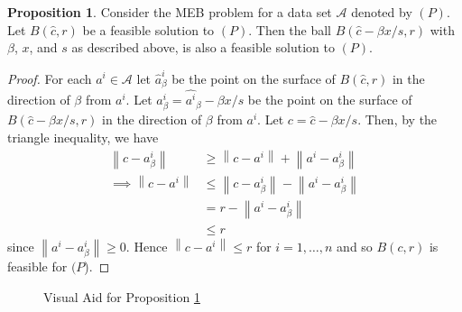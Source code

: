 \documentclass[11pt,twoside]{report}
\newcommand{\A}{\mathcal{A}} %
\newcommand{\norm}[1]{\left\lVert#1\right\rVert}
\theoremstyle{definition}
\newtheorem{proposition}{Proposition}
\numberwithin{theorem}{section}
\numberwithin{definition}{section}
\numberwithin{lemma}{section}
\numberwithin{proposition}{section}
\numberwithin{equation}{section}
\numberwithin{figure}{section}
\begin{document}
\begin{proposition}\label{imp heuristic feasibility}
Consider the MEB problem for a data set $\A$ denoted by $(P)$. Let $B(\hat{c},r)$ be a feasible solution to $(P)$. Then the ball $B(\hat{c}-\beta x/s, r)$ with $\beta$, $x$, and $s$ as described above, is also a feasible solution to $(P)$.
\end{proposition}
\begin{proof}
For each $a^i\in\A$ let $\hat{a}^i_\beta$ be the point on the surface of $B(\hat{c},r)$ in the direction of $\beta$ from $a^i$. Let $a^i_\beta=\hat{a^i}_\beta - \beta x/s$ be the point on the surface of $B(\hat{c}-\beta x/s, r)$ in the direction of $\beta$ from $a^i$. Let $c=\hat{c}-\beta x/s$. Then, by the triangle inequality, we have
\begin{align*}
    \norm{c-a^i_\beta} &\geq \norm{c-a^i} + \norm{a^i-a^i_\beta} \\
    \implies \norm{c-a^i} &\leq \norm{c-a^i_\beta} - \norm{a^i-a^i_\beta} \\
    &= r-\norm{a^i-a^i_\beta} \\
    &\leq r
\end{align*}
since $\norm{a^i-a^i_\beta}\geq0$. Hence $\norm{c-a^i}\leq r$ for $i=1,\ldots,n$ and so $B(c, r)$ is feasible for $(P$).
\end{proof}
\begin{figure}
    \centering
    \caption{Visual Aid for Proposition \ref{imp heuristic feasibility}}
    \label{vis aid feasibility}
\end{figure}
\end{document}
